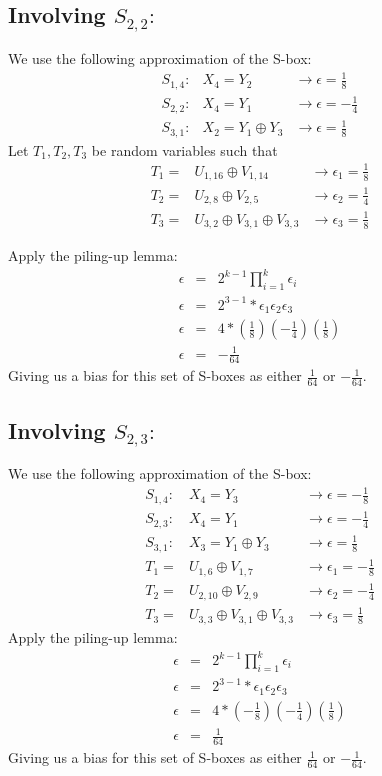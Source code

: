 \documentclass{elsart}
\begin{document}
\subsection{Involving $S_{2,2}:$}
We use the following approximation of the S-box:
\begin{eqnarray*}
S_{1,4}: &X_{4}=Y_{2} &\rightarrow \epsilon=\frac{1}{8} \\
S_{2,2}: &X_{4}=Y_{1} &\rightarrow \epsilon=-\frac{1}{4} \\
S_{3,1}: &X_{2}=Y_{1} \oplus Y_{3} &\rightarrow \epsilon=\frac{1}{8}
\end{eqnarray*}
Let $T_{1}, T_{2}, T_{3}$ be random variables such that
\begin{eqnarray*}
T_{1} = &U_{1,16} \oplus V_{1,14} &\rightarrow \epsilon_{1}=\frac{1}{8} \\
T_{2} = &U_{2,8} \oplus V_{2,5} &\rightarrow \epsilon_{2}=\frac{1}{4} \\
T_{3} = &U_{3,2} \oplus V_{3,1} \oplus V_{3,3} 
  &\rightarrow \epsilon_{3}=\frac{1}{8}
\end{eqnarray*}

Apply the piling-up lemma:
\begin{eqnarray*}
  \epsilon &=& 2^{k-1} \displaystyle\prod_{i=1}^k \epsilon_{i} \\
  \epsilon &=& 2^{3-1} * \epsilon_{1}\epsilon_{2}\epsilon_{3} \\
  \epsilon &=& 4 * (\frac{1}{8})(-\frac{1}{4})(\frac{1}{8}) \\
  \epsilon &=& -\frac{1}{64}
\end{eqnarray*}
Giving us a bias for this set of S-boxes as either $\frac{1}{64}$ 
or $-\frac{1}{64}$.
\newpage
\subsection{Involving $S_{2,3}:$}
We use the following approximation of the S-box:
\begin{eqnarray*}
S_{1,4}: &X_{4}=Y_{3} &\rightarrow \epsilon=-\frac{1}{8} \\
S_{2,3}: &X_{4}=Y_{1} &\rightarrow \epsilon=-\frac{1}{4} \\
S_{3,1}: &X_{3}=Y_{1} \oplus Y_{3} &\rightarrow \epsilon=\frac{1}{8} \\
T_{1} = &U_{1,6} \oplus V_{1,7} &\rightarrow \epsilon_{1}=-\frac{1}{8} \\
T_{2} = &U_{2,10} \oplus V_{2,9} &\rightarrow \epsilon_{2}=-\frac{1}{4} \\
T_{3} = &U_{3,3} \oplus V_{3,1} \oplus V_{3,3} 
  &\rightarrow \epsilon_{3}=\frac{1}{8}
\end{eqnarray*}
Apply the piling-up lemma:
\begin{eqnarray*}
  \epsilon &=& 2^{k-1} \displaystyle\prod_{i=1}^k \epsilon_{i} \\
  \epsilon &=& 2^{3-1} * \epsilon_{1}\epsilon_{2}\epsilon_{3} \\
  \epsilon &=& 4 * (-\frac{1}{8})(-\frac{1}{4})(\frac{1}{8}) \\
  \epsilon &=& \frac{1}{64}
\end{eqnarray*}
Giving us a bias for this set of S-boxes as either $\frac{1}{64}$ 
or $-\frac{1}{64}$.
\newpage
\end{document}
